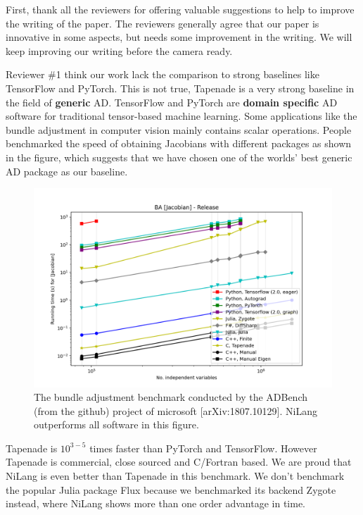 \documentclass{article}
\begin{document}
First, thank all the reviewers for offering valuable suggestions to help to improve the writing of the paper.
The reviewers generally agree that our paper is innovative in some aspects, but needs some improvement in the writing.
We will keep improving our writing before the camera ready.

Reviewer \#1 think our work lack the comparison to strong baselines like TensorFlow and PyTorch.
This is not true, Tapenade is a very strong baseline in the field of \textbf{generic} AD.
TensorFlow and PyTorch are \textbf{domain specific} AD software for traditional tensor-based machine learning.
Some applications like the bundle adjustment in computer vision mainly contains scalar operations.
People benchmarked the speed of obtaining Jacobians with different packages as shown in the figure, which suggests that we have chosen one of the worlds' best generic AD package as our baseline.
\begin{figure}
    \centerline{\includegraphics[width=0.5\columnwidth,trim={0 1cm 1cm 1.7cm},clip]{ba-jacobian-adbench.png}}
    \caption{The bundle adjustment benchmark conducted by the ADBench (from the github) project of microsoft [arXiv:1807.10129]. NiLang outperforms all software in this figure.}\label{bench-ba}
\end{figure}
Tapenade is $10^{3-5}$ times faster than PyTorch and TensorFlow. However Tapenade is commercial, close sourced and C/Fortran based.
We are proud that NiLang is even better than Tapenade in this benchmark.
We don't benchmark the popular Julia package Flux because we benchmarked its backend Zygote instead, where NiLang shows more than one order advantage in time.
\end{document}
